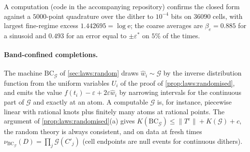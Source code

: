 A computation (code in the accompanying repository) confirms the closed form against a $5000$-point quadrature over the dither to $10^{-4}$ bits on $36090$ cells, with largest fine-regime excess $1.442695=\log\mathrm e$; the coarse averages are $\beta_e=0.885$ for a sinusoid and $0.493$ for an error equal to $\pm\varepsilon^*$ on $5\%$ of the times.

\paragraph{Band-confined completions.} The machine $\mathrm{BC}_{\mathcal G}$ of \cref{sec:laws:random} draws $\hat w_i\sim\mathcal G$ by the inverse distribution function from the uniform variables $U_i$ of the proof of \cref{prop:laws:randomised}, and emits the value $f(t_i)-\varepsilon+2\varepsilon\hat w_i$ by narrowing intervals for the continuous part of $\mathcal G$ and exactly at an atom. A computable $\mathcal G$ is, for instance, piecewise linear with rational knots plus finitely many atoms at rational points. The argument of \cref{prop:laws:randomised}(a) gives $K(\mathrm{BC}_{\mathcal G})\le\lVert T^\varepsilon\rVert+K(\mathcal G)+c$, the random theory is always consistent, and on data at fresh times $\nu_{\mathrm{BC}_{\mathcal G}}(D)=\prod_j\mathcal G(C'_j)$ (cell endpoints are null events for continuous dithers).


